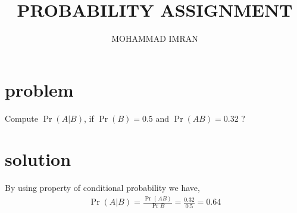 \documentclass[journal,12pt,twocolumn]{article}
\title{PROBABILITY ASSIGNMENT}
\author{MOHAMMAD IMRAN}
\providecommand{\pr}[1]{\ensuremath{\Pr\left(#1\right)}}
\begin{document}
\maketitle
\bigskip

\section{problem }

Compute $\pr{A|B}$, if $\pr{B}=0.5$ and $\pr{AB}=0.32$ ?

\section{solution }

By using property of conditional probability we have,
\begin{align}
\pr{A|B}=\frac{\pr{AB}}{\Pr{B}}=\frac{0.32}{0.5}=0.64
\end{align}

 
\end{document}
